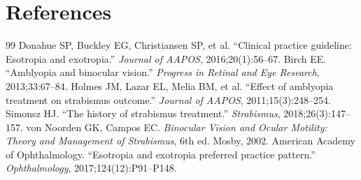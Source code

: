 \section*{References}
\begin{thebibliography}{99}
 Donahue SP, Buckley EG, Christiansen SP, et al. ``Clinical practice guideline: Esotropia and exotropia.'' \textit{Journal of AAPOS}, 2016;20(1):56--67.
 Birch EE. ``Amblyopia and binocular vision.'' \textit{Progress in Retinal and Eye Research}, 2013;33:67--84.
 Holmes JM, Lazar EL, Melia BM, et al. ``Effect of amblyopia treatment on strabismus outcome.'' \textit{Journal of AAPOS}, 2011;15(3):248--254.
 Simonsz HJ. ``The history of strabismus treatment.'' \textit{Strabismus}, 2018;26(3):147--157.
 von Noorden GK, Campos EC. \textit{Binocular Vision and Ocular Motility: Theory and Management of Strabismus}, 6th ed. Mosby, 2002.
 American Academy of Ophthalmology. ``Esotropia and exotropia preferred practice pattern.'' \textit{Ophthalmology}, 2017;124(12):P91--P148.
\end{thebibliography}
